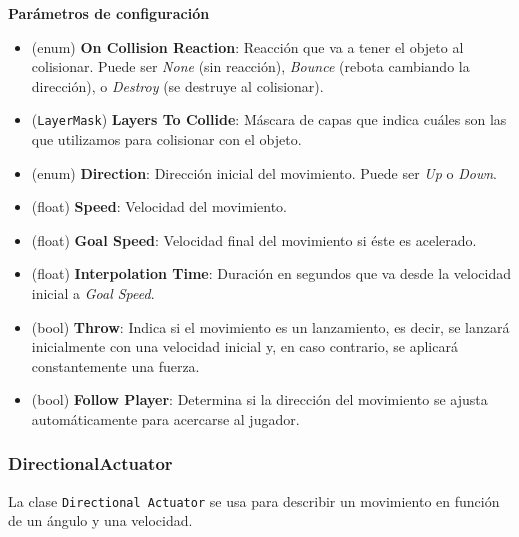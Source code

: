 \textbf{Parámetros de configuración}
\begin{itemize}
	\item (enum) \textbf{On Collision Reaction}: Reacción que va a tener el objeto al colisionar. Puede ser \textit{None} (sin reacción), \textit{Bounce} (rebota cambiando la dirección), o \textit{Destroy} (se destruye al colisionar).
	\item (\texttt{LayerMask}) \textbf{Layers To Collide}: Máscara de capas que indica cuáles son las que utilizamos para colisionar con el objeto.
	\item (enum) \textbf{Direction}: Dirección inicial del movimiento. Puede ser \textit{Up} o \textit{Down}.
	\item (float) \textbf{Speed}: Velocidad del movimiento.
	\item (float) \textbf{Goal Speed}: Velocidad final del movimiento si éste es acelerado.
	\item (float) \textbf{Interpolation Time}: Duración en segundos que va desde la velocidad inicial a \textit{Goal Speed}.
	\item (bool) \textbf{Throw}: Indica si el movimiento es un lanzamiento, es decir, se lanzará inicialmente con una velocidad inicial y, en caso contrario, se aplicará constantemente una fuerza.
	\item (bool) \textbf{Follow Player}: Determina si la dirección del movimiento se ajusta automáticamente para acercarse al jugador.
\end{itemize}

\subsubsection{DirectionalActuator}
La clase \texttt{Directional Actuator} se usa para describir un movimiento en función de un ángulo y una velocidad.\\

